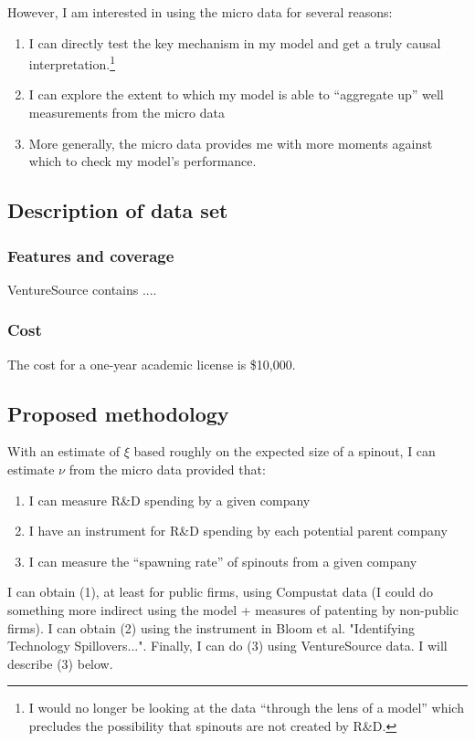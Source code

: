 \documentclass[12pt,english]{article}
\theoremstyle{remark}
\begin{document}
However, I am interested in using the micro data for several reasons:
\begin{enumerate}
	\item I can directly test the key mechanism in my model and get a truly causal interpretation.\footnote{I would no longer be looking at the data ``through the lens of a model'' which precludes the possibility that spinouts are not created by R\&D.}
	\item I can explore the extent to which my model is able to ``aggregate up'' well measurements from the micro data
	\item More generally, the micro data provides me with more moments against which to check my model's performance.
\end{enumerate}

\subsection{Description of data set}

\subsubsection{Features and coverage}

VentureSource contains ....

\subsubsection{Cost}

The cost for a one-year academic license is \$10,000. 

\subsection{Proposed methodology}

With an estimate of $\xi$ based roughly on the expected size of a spinout, I can estimate $\nu$ from the micro data provided that: 

\begin{enumerate}
	\item I can measure R\&D spending by a given company
	\item I have an instrument for R\&D spending by each potential parent company
	\item I can measure the ``spawning rate'' of spinouts from a given company
\end{enumerate}

I can obtain (1), at least for public firms, using Compustat data (I could do something more indirect using the model + measures of patenting by non-public firms). I can obtain (2) using the instrument in Bloom et al. "Identifying Technology Spillovers...". Finally, I can do (3) using VentureSource data. I will describe (3) below. 
\end{document}
